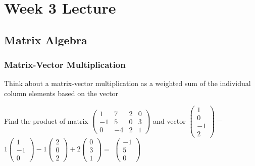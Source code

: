 \chapter{Week 3 Lecture}

\section{Matrix Algebra}

\subsection{Matrix-Vector Multiplication}
\begin{framed}
   Think about a matrix-vector multiplication as a weighted sum of the individual column elements based on the vector

   Find the product of matrix $ \begin{pmatrix} 
      1 & 7 & 2 & 0 \\
      -1 & 5 & 0 & 3 \\
      0 & -4 & 2 & 1 
   \end{pmatrix}
   $ and vector $ \begin{pmatrix} 1 \\ 0 \\ -1 \\ 2 \end{pmatrix} =$  \\
   $1 \begin{pmatrix} 1\\-1\\0 \end{pmatrix} -1 \begin{pmatrix} 2 \\ 0 \\ 2 \end{pmatrix} + 2 \begin{pmatrix} 0 \\ 3 \\1 \end{pmatrix} = $  
   $ \begin{pmatrix} -1 \\ 5 \\ 0 \end{pmatrix} $
\end{framed}

